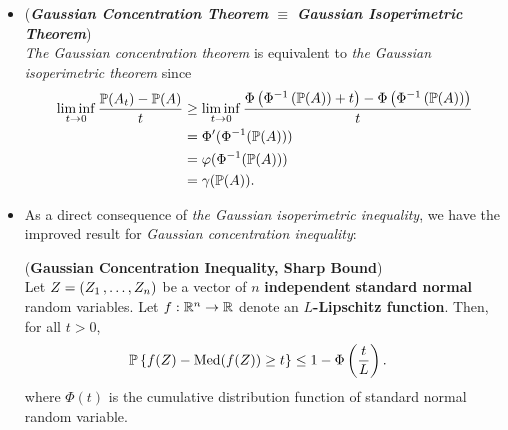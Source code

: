 \documentclass[11pt]{article}
\begin{document}
\begin{itemize}
\begin{proof}
\begin{enumerate}
\item Now let A be \emph{any Borel set} with $\bP(A) > 0$. Let $0 < \epsilon < t$. Then by \textbf{\emph{Vitali's covering theorem}}, there exists a \emph{countable} collection of \emph{disjoint open balls} $\set{B_1, B_2, \ldots}$, all intersecting $A$ and \emph{diameter at most} $\epsilon$, such that $P(A - \bigcup_{n=1}^{\infty}B_n) = 0$. But then
\begin{align*}
\bP(A_t) &\ge \bP\paren{\bigcup_{n=1}^{\infty}(B_n)_{t - \epsilon}}\\
&= \lim\limits_{n \to \infty}\bP\paren{\bigcup_{i=1}^{n}(B_i)_{t - \epsilon}}\\
&\ge \lim\limits_{n \to \infty}\Phi\paren{\Phi^{-1}\paren{\bP\paren{\bigcup_{i=1}^{n}(B_i)_{t - \epsilon}}} + t - \epsilon}\\
&= \Phi\paren{\Phi^{-1}\paren{\bP\paren{\bigcup_{i=1}^{\infty}(B_i)_{t - \epsilon}}} + t - \epsilon}\\
&\ge \Phi\paren{\Phi^{-1}\paren{\bP\paren{A}} + t - \epsilon}
\end{align*} The argument is completed by taking $\epsilon$ to $0$. \qed
\end{enumerate}
\end{proof}

\item \begin{remark} (\emph{\textbf{Gaussian Concentration Theorem} $\equiv$ \textbf{Gaussian Isoperimetric Theorem}}) \\
\emph{The Gaussian concentration theorem} is equivalent to \emph{the Gaussian isoperimetric theorem} since
\begin{align*}
\liminf\limits_{t \to 0}\frac{{\mathbb P}(A_t) - {\mathbb P}(A)}{t} &\ge \liminf\limits_{t \to 0}\frac{\Phi\left(\Phi^{-1}\left({\mathbb P}(A)\right) + t\right) - \Phi\left(\Phi^{-1}\left({\mathbb P}(A)\right)\right)}{t} \\
&= \Phi'(\Phi^{-1}({\mathbb P}(A))) \\
&= \varphi(\Phi^{-1}({\mathbb P}(A))) \\
&= \gamma({\mathbb P}(A)).
\end{align*}
\end{remark}

\item As a direct consequence of \emph{the Gaussian isoperimetric inequality}, we have the improved result for \emph{Gaussian concentration inequality}:
 \begin{theorem}  (\textbf{Gaussian Concentration Inequality, Sharp Bound}) \citep{boucheron2013concentration, wainwright2019high} \\
Let $Z = (Z_1 \,{,}\ldots{,}\, Z_n)$ be a vector of $n$ \textbf{independent} \textbf{standard normal} random variables. Let $f : {\mathbb R}^n \to {\mathbb R}$ denote an \textbf{$L$-Lipschitz function}. Then, for all $t > 0$, 
\begin{align}
{\mathbb P}\left\{f(Z) - \text{Med}(f(Z)) \ge t \right\} &\le 1 - \Phi\left(\frac{t}{L}\right). \label{ineqn: gaussian_concentration_inequality_improved}
\end{align} where $\Phi(t)$ is the cumulative distribution function of standard normal random variable.
\end{theorem}


\end{itemize}
\end{document}
